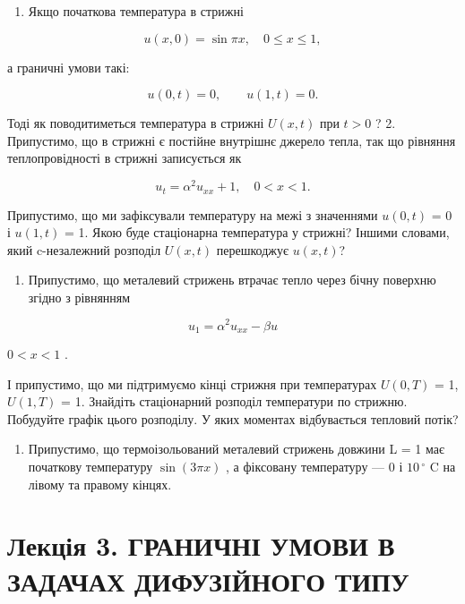 \documentclass[
  ukrainian,
]{article}
\providecommand{\tightlist}{%
  \setlength{\itemsep}{0pt}\setlength{\parskip}{0pt}}
\begin{document}
\begin{enumerate}
\def\labelenumi{\arabic{enumi}.}
\tightlist
\item
  Якщо початкова температура в стрижні
\end{enumerate}

\[
u(x, 0) = \sin \pi x, \quad 0 \leqslant x \leqslant 1,
\]

а граничні умови такі:

\[
u(0, t) = 0, \qquad u(1, t) = 0.
\]

Тоді як поводитиметься температура в стрижні \(U(x, t)\) при \(t > 0\) ?
2. Припустимо, що в стрижні є постійне внутрішнє джерело тепла, так що
рівняння теплопровідності в стрижні записується як

\[
u_t = \alpha^2 u_{xx} + 1, \quad 0 < x < 1.
\]

Припустимо, що ми зафіксували температуру на межі з значеннями
\(u(0, t)\) = 0 і \(u(1, t)\) = 1. Якою буде стаціонарна температура у
стрижні? Іншими словами, який c-незалежний розподіл \(U(x, t)\)
перешкоджує \(u(x, t)\)?

\begin{enumerate}
\def\labelenumi{\arabic{enumi}.}
\setcounter{enumi}{2}
\tightlist
\item
  Припустимо, що металевий стрижень втрачає тепло через бічну поверхню
  згідно з рівнянням
\end{enumerate}

\[
u_1 = \alpha^2 u_{xx} - \beta u
\]

\(0 < x < 1\) .

І припустимо, що ми підтримуємо кінці стрижня при температурах
\(U(0, T)\) = 1, \(U(1, T)\) = 1. Знайдіть стаціонарний розподіл
температури по стрижню. Побудуйте графік цього розподілу. У яких
моментах відбувається тепловий потік?

\begin{enumerate}
\def\labelenumi{\arabic{enumi}.}
\setcounter{enumi}{3}
\tightlist
\item
  Припустимо, що термоізольований металевий стрижень довжини L = 1 має
  початкову температуру \(\sin(3\pi x)\) , а фіксовану температуру --- 0
  і \(10\,^{\circ}\) C на лівому та правому кінцях.
\end{enumerate}

\section{Лекція 3. ГРАНИЧНІ УМОВИ В ЗАДАЧАХ ДИФУЗІЙНОГО
ТИПУ}\label{ux43bux435ux43aux446ux456ux44f-3.-ux433ux440ux430ux43dux438ux447ux43dux456-ux443ux43cux43eux432ux438-ux432-ux437ux430ux434ux430ux447ux430ux445-ux434ux438ux444ux443ux437ux456ux439ux43dux43eux433ux43e-ux442ux438ux43fux443}
\end{document}
